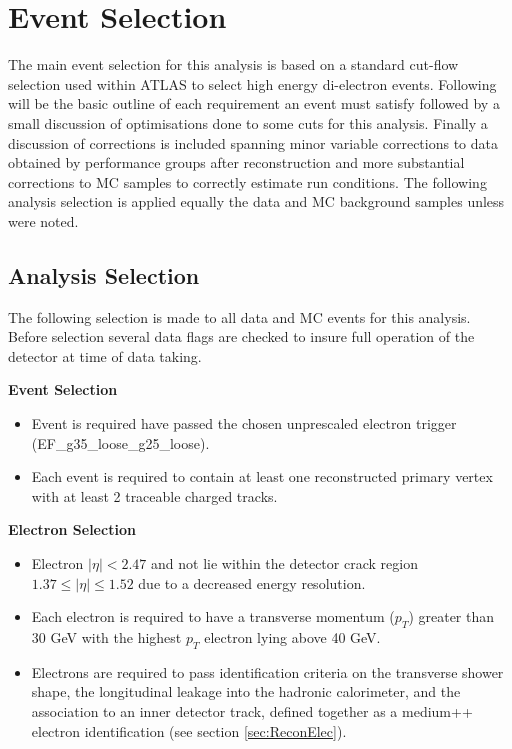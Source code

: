\chapter{Event Selection}

The main event selection for this analysis is based on a standard cut-flow selection used within ATLAS to select high energy di-electron events. Following will be the basic outline of each requirement an event must satisfy followed by a small discussion of optimisations done to some cuts for this analysis. Finally a discussion of corrections is included spanning minor variable corrections to data obtained by performance groups after reconstruction and more substantial corrections to MC samples to correctly estimate run conditions.
The following analysis selection is applied equally the data and MC background samples unless were noted.


\section{Analysis Selection}

The following selection is made to all data and MC events for this analysis. Before selection several data flags are checked to insure full operation of the detector at time of data taking. 

{\bf Event Selection}
\begin{itemize}
\item Event is required have passed the chosen unprescaled electron trigger (EF\_g35\_loose\_g25\_loose).
\item Each event is required to contain at least one reconstructed primary vertex with at least 2 traceable charged tracks.
\end{itemize}


{\bf Electron Selection}
\begin{itemize}
\item Electron $|\eta| < 2.47$ and not lie within the detector crack region $1.37 \leq |\eta| \leq 1.52$ due to a decreased energy resolution.
\item Each electron is required to have a transverse momentum ($p_{T}$) greater than 30 GeV with the highest $p_{T}$ electron lying above 40 GeV.
\item Electrons are required to pass identification criteria on the transverse shower shape, the longitudinal leakage into the hadronic calorimeter, and the association to an inner detector track, defined together as a medium++ electron identification (see section \ref{sec:ReconElec}). 
\end{itemize}


